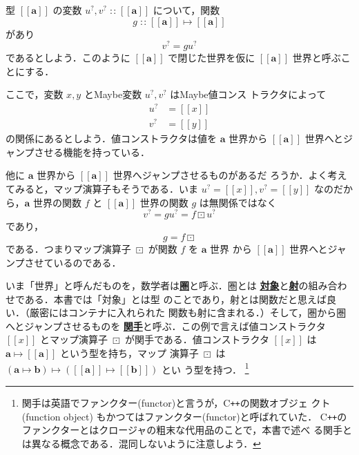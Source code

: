 \documentclass[a5paper,twoside,fleqn,draft]{jsbook}
\def\[{[\![}
\def\]{]\!]}
\newcommand{\programminglanguage}[1]{\textsf{#1}}
\newcommand{\cxx}{\programminglanguage{C}\texttt{++}}
\newcommand{\keyword}[1]{{\underline{\textbf{#1}}}}
\DeclareMathOperator{\mIn}{{:\!:}}
\DeclareMathOperator{\mMapMaybe}{\boxdot}
\DeclareMathOperator{\mMapsTo}{\mapsto}
\newcommand{\mType}[1]{\mathbf{#1}} %
\newcommand{\mA}{\mType{a}}
\newcommand{\mB}{\mType{b}}
\newcommand{\mTypeAssemble}[2]{{}^{\mType{#1}}\[\mType{#2}\]}
\newcommand{\mMaybeType}[1]{\[\mType{#1}\]}%
\newcommand{\mValueConstructor}[1]{\mathrm{#1}}
\newcommand{\mValueWith}[2]{{}^\mValueConstructor{#1}\[#2\]}
\newcommand{\mJustWith}[1]{\[#1\]}%
\newcommand{\mMaybe}[1]{{#1}^?}
\begin{document}
型 $\mMaybeType{a}$ の変数 $\mMaybe{u},\mMaybe{v}\mIn\mMaybeType{a}$
について，関数
\begin{equation}
  g
  \mIn\mMaybeType{a}\mMapsTo\mMaybeType{a}
\end{equation}
があり
\begin{equation}
  \mMaybe{v}
  =g\mMaybe{u}
\end{equation}
であるとしよう．このように $\mMaybeType{a}$ で閉じた世界を仮に
$\mMaybeType{a}$ 世界と呼ぶことにする．

ここで，変数 $x,y$ とMaybe変数 $\mMaybe{u},\mMaybe{v}$ はMaybe値コンス
トラクタによって
\begin{align}
  \mMaybe{u}
  &=\mJustWith{x}\\
  \mMaybe{v}
  &=\mJustWith{y}
\end{align}
の関係にあるとしよう．値コンストラクタは値を $\mA$ 世界から
$\mMaybeType{a}$ 世界へとジャンプさせる機能を持っている．

他に $\mA$ 世界から $\mMaybeType{a}$ 世界へジャンプさせるものがあるだ
ろうか．よく考えてみると，マップ演算子もそうである．いま
$\mMaybe{u}=\mJustWith{x},\mMaybe{v}=\mJustWith{y}$ なのだから，$\mA $
世界の関数 $f$ と $\mMaybeType{a}$ 世界の関数 $g$ は無関係ではなく
\begin{equation}
  \mMaybe{v}
  =g\mMaybe{u}
  =f\mMapMaybe\mMaybe{u}
\end{equation}
であり，
\begin{equation}
  g
  =f\mMapMaybe
\end{equation}
である．つまりマップ演算子 $\mMapMaybe$ が関数 $f$ を $\mA$ 世界
から $\mMaybeType{a}$ 世界へとジャンプさせているのである．

いま「世界」と呼んだものを，数学者は\keyword{圏}と呼ぶ．圏とは
\keyword{対象}と\keyword{射}の組み合わせである．本書では「対象」とは型
のことであり，射とは関数だと思えば良い．（厳密にはコンテナに入れられた
  関数も射に含まれる．）そして，圏から圏へとジャンプさせるものを
\keyword{関手}と呼ぶ．この例で言えば値コンストラクタ $\mJustWith{x}$
とマップ演算子 $\mMapMaybe$ が関手である．値コンストラクタ
$\mJustWith{x}$ は $\mA\mMapsTo\mMaybeType{a}$ という型を持ち，マップ
演算子 $\mMapMaybe$ は
$(\mA\mMapsTo\mB)\mMapsTo(\mMaybeType{a}\mMapsTo\mMaybeType{b})$ とい
う型を持つ．
\footnote{関手は英語でファンクター(functor)と言うが，\cxx の関数オブジェ
  クト (function object) もかつてはファンクター(functor)と呼ばれていた．
  \cxx のファンクターとはクロージャの粗末な代用品のことで，本書で述べ
  る関手とは異なる概念である．混同しないように注意しよう．}
\end{document}
